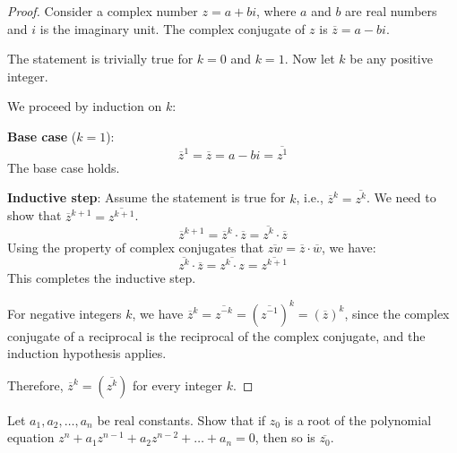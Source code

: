             \begin{proof}
            Consider a complex number \( z = a + bi \), where \( a \) and \( b \) are real numbers and \( i \) is the imaginary unit. The complex conjugate of \( z \) is \( \overline{z} = a - bi \).
            
            The statement is trivially true for \( k = 0 \) and \( k = 1 \). Now let \( k \) be any positive integer.
            
            We proceed by induction on \( k \):
            
            \textbf{Base case} (\( k = 1 \)):
            \[ \overline{z}^1 = \overline{z} = a - bi = \overline{z^1} \]
            The base case holds.
            
            \textbf{Inductive step}:
            Assume the statement is true for \( k \), i.e., \( \overline{z}^k = \overline{z^k} \). We need to show that \( \overline{z}^{k+1} = \overline{z^{k+1}} \).
            \[ \overline{z}^{k+1} = \overline{z}^k \cdot \overline{z} = \overline{z^k} \cdot \overline{z} \]
            Using the property of complex conjugates that \( \overline{zw} = \overline{z} \cdot \overline{w} \), we have:
            \[ \overline{z^k} \cdot \overline{z} = \overline{z^k \cdot z} = \overline{z^{k+1}} \]
            This completes the inductive step.
            
            For negative integers \( k \), we have \( \overline{z}^k = \overline{z^{-k}} = (\overline{z^{-1}})^k = (\overline{z})^k \), since the complex conjugate of a reciprocal is the reciprocal of the complex conjugate, and the induction hypothesis applies.
            
            Therefore, \( \overline{z}^k = (\overline{z^k}) \) for every integer \( k \).
            \end{proof}

            \begin{exercise}\label{conjugate root}
                Let \( a_1, a_2, \ldots, a_n \) be real constants. Show that if \( z_0 \) is a root of the polynomial equation \( z^n + a_1z^{n-1} + a_2z^{n-2} + \ldots + a_n = 0 \), then so is \( \overline{z_0} \).
                \end{exercise}
                

